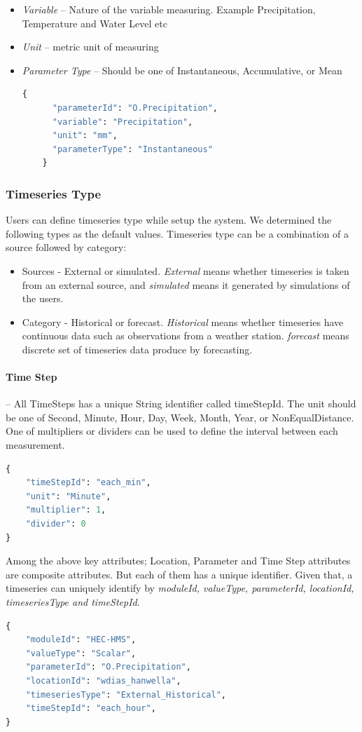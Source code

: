 \begin{itemize}  
  \item \emph{Variable} -- Nature of the variable measuring. Example Precipitation, Temperature and Water Level etc
  \item \emph{Unit} -- metric unit of measuring
  \item \emph{Parameter Type} -- Should be one of Instantaneous, Accumulative, or Mean
  \begin{lstlisting}[language=Python]
    {
      "parameterId": "O.Precipitation",
      "variable": "Precipitation",
      "unit": "mm",
      "parameterType": "Instantaneous"
    }
  \end{lstlisting}
\end{itemize}

\subsubsection{Timeseries Type}
Users can define timeseries type while setup the system. We determined the following types as the default values. Timeseries type can be a combination of a source followed by category:
\begin{itemize}
  \item Sources - External or simulated. \emph{External} means whether timeseries is taken from an external source, and \emph{simulated} means it generated by simulations of the users.
  \item Category - Historical or forecast. \emph{Historical} means whether timeseries have continuous data such as observations from a weather station. \emph{forecast} means discrete set of timeseries data produce by forecasting.
\end{itemize}

\paragraph{Time Step}-- All TimeSteps has a unique String identifier called timeStepId. The unit should be one of Second, Minute, Hour, Day, Week, Month, Year, or NonEqualDistance. One of multipliers or dividers can be used to define the interval between each measurement.
\begin{lstlisting}[language=Python]
{
    "timeStepId": "each_min",
    "unit": "Minute",
    "multiplier": 1,
    "divider": 0
}
\end{lstlisting}

Among the above key attributes; Location, Parameter and Time Step attributes are composite attributes. But each of them has a unique identifier.
Given that, a timeseries can uniquely identify by \emph{moduleId, valueType, parameterId, locationId, timeseriesType and timeStepId}.
\begin{lstlisting}[language=Python]
{
	"moduleId": "HEC-HMS",
	"valueType": "Scalar",
	"parameterId": "O.Precipitation",
	"locationId": "wdias_hanwella",
	"timeseriesType": "External_Historical",
	"timeStepId": "each_hour",
}
\end{lstlisting}

